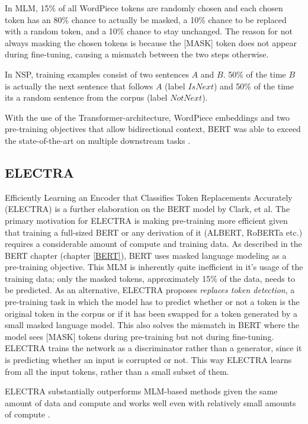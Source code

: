 In MLM, 15\% of all WordPiece tokens are randomly chosen and each chosen token has an 80\% chance to actually be masked, a 10\% chance to be replaced with a random token, and a 10\% chance to stay unchanged.
The reason for not always masking the chosen tokens is because the [MASK] token does not appear during fine-tuning, causing a mismatch between the two steps otherwise.

In NSP, training examples consist of two sentences $A$ and $B$.
50\% of the time $B$ is actually the next sentence that follows $A$ (label $IsNext$) and 50\% of the time its a random sentence from the corpus (label $NotNext$).

With the use of the Transformer-architecture, WordPiece embeddings and two pre-training objectives that allow bidirectional context, BERT was able to exceed the state-of-the-art on multiple downstream tasks \cite{devlin2019}.

\subsection{ELECTRA} \label{ELECTRA}
Efficiently Learning an Encoder that Classifies Token Replacements Accurately (ELECTRA) is a further elaboration on the BERT model by Clark, et al. \cite{clark2020}
The primary motivation for ELECTRA is making pre-training more efficient given that training a full-sized BERT or any derivation of it (ALBERT, RoBERTa etc.) requires a considerable amount of compute and training data.
As described in the BERT chapter (chapter \ref{BERT}), BERT uses masked language modeling as a pre-training objective.
This MLM is inherently quite inefficient in it's usage of the training data; only the masked tokens, approximately 15\% of the data, needs to be predicted.
As an alternative, ELECTRA proposes \textit{replaces token detection}, a pre-training task in which the model has to predict whether or not a token is the original token in the corpus or if it has been swapped for a token generated by a small masked language model.
This also solves the mismatch in BERT where the model sees [MASK] tokens during pre-training but not during fine-tuning.
ELECTRA trains the network as a discriminator rather than a generator, since it is predicting whether an input is corrupted or not.
This way ELECTRA learns from all the input tokens, rather than a small subset of them.

ELECTRA substantially outperforms MLM-based methods given the same amount of data and compute and works well even with relatively small amounts of compute \cite{clark2020}.
